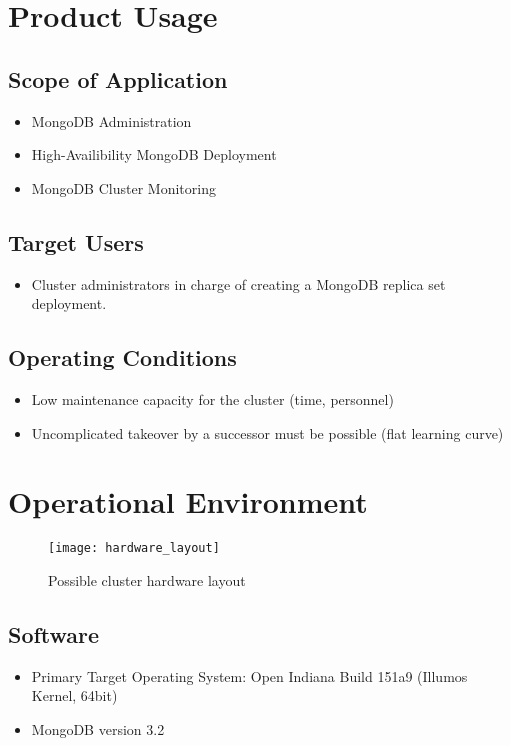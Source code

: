 \documentclass[a4paper, 11pt]{article}
\begin{document}
\section{Product Usage}

\subsection{Scope of Application}
\begin{itemize}
\item \gls{MongoDB}  Administration
\item High-Availibility MongoDB Deployment
\item MongoDB Cluster Monitoring
\end{itemize}

\subsection{Target Users}
\begin{itemize}
\item Cluster \glspl{administrator} in charge of creating a MongoDB replica set deployment.
\end{itemize}

\subsection{Operating Conditions}
\begin{itemize}

\item Low maintenance capacity for the cluster (time, personnel)
\item Uncomplicated takeover by a successor must be possible (flat learning curve)
\end{itemize}

\section{Operational Environment}

\begin{figure}[H]
	\centering
	\texttt{[image: hardware\_layout]}
	\caption{Possible cluster hardware layout}
\end{figure}

\subsection{Software}\label{subsec:Software}
\begin{itemize}
\item Primary Target Operating System: Open Indiana Build 151a9 (Illumos Kernel, 64bit)
\item MongoDB version 3.2
\end{itemize}
\end{document}
